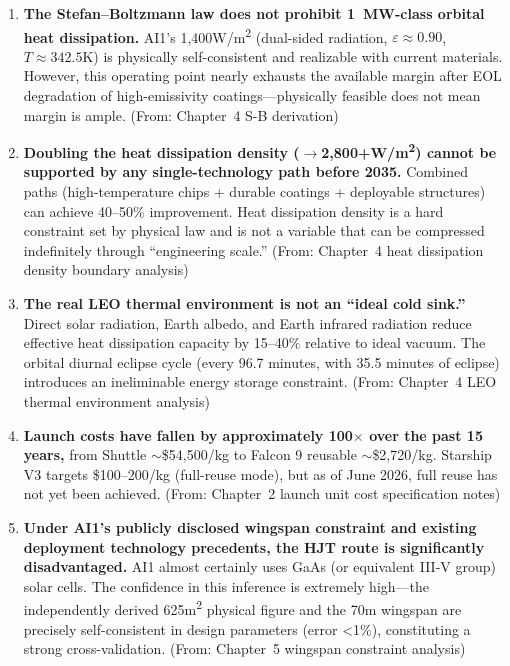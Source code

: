 \begin{enumerate}[leftmargin=*]
    \item \textbf{The Stefan--Boltzmann law does not prohibit 1~MW-class orbital heat dissipation.} AI1's 1,400\;W/m\textsuperscript{2} (dual-sided radiation, $\varepsilon\approx0.90$, $T\approx342.5$\;K) is physically self-consistent and realizable with current materials. However, this operating point nearly exhausts the available margin after EOL degradation of high-emissivity coatings---physically feasible does not mean margin is ample. (From: Chapter~4 S-B derivation)

    \item \textbf{Doubling the heat dissipation density ($\to$2,800+\;W/m\textsuperscript{2}) cannot be supported by any single-technology path before 2035.} Combined paths (high-temperature chips + durable coatings + deployable structures) can achieve 40--50\% improvement. Heat dissipation density is a hard constraint set by physical law and is not a variable that can be compressed indefinitely through ``engineering scale.'' (From: Chapter~4 heat dissipation density boundary analysis)

    \item \textbf{The real LEO thermal environment is not an ``ideal cold sink.''} Direct solar radiation, Earth albedo, and Earth infrared radiation reduce effective heat dissipation capacity by 15--40\% relative to ideal vacuum. The orbital diurnal eclipse cycle (every 96.7 minutes, with 35.5 minutes of eclipse) introduces an ineliminable energy storage constraint. (From: Chapter~4 LEO thermal environment analysis)

    \item \textbf{Launch costs have fallen by approximately 100$\times$ over the past 15 years,} from Shuttle $\sim$\$54,500/kg to Falcon 9 reusable $\sim$\$2,720/kg. Starship V3 targets \$100--200/kg (full-reuse mode), but as of June 2026, full reuse has not yet been achieved\cite{nasalaunch2018,faa2025boca,faa2026ksc}. (From: Chapter~2 launch unit cost specification notes)

    \item \textbf{Under AI1's publicly disclosed wingspan constraint and existing deployment technology precedents, the HJT route is significantly disadvantaged.} AI1 almost certainly uses GaAs (or equivalent III-V group) solar cells. The confidence in this inference is extremely high---the independently derived 625\;m\textsuperscript{2} physical figure and the 70\;m wingspan are precisely self-consistent in design parameters (error <1\%), constituting a strong cross-validation. (From: Chapter~5 wingspan constraint analysis)
\end{enumerate}

